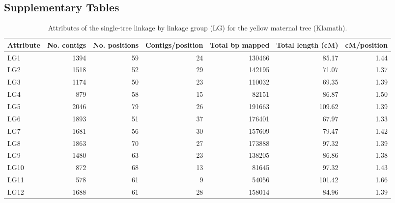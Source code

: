 \documentclass[smallextended]{svjour3}
\begin{document}
\begin{landscape}

\subsection*{Supplementary Tables}\label{ss:supp}

  
\begin{table}[ht]
  \caption{Attributes of the single-tree linkage by linkage group (LG) for the yellow maternal tree (Klamath).}
\begin{tabular}{lrrrrrr}
  \toprule
  Attribute & No. contigs & No. positions & Contigs/position & Total bp mapped & Total length (cM) & cM/position \\
  \midrule
  LG1 & 1394 & 59 & 24 & \num{130466} & 85.17 & 1.44 \\
  LG2 & 1518 & 52 & 29 & \num{142195} & 71.07 & 1.37 \\
  LG3 & 1174 & 50 & 23 & \num{110032} & 69.35 & 1.39 \\
  LG4 & 879 & 58 & 15 & \num{82151} & 86.87 & 1.50 \\
  LG5 & 2046 & 79 & 26 & \num{191663} & 109.62 & 1.39 \\
  LG6 & 1893 & 51 & 37 & \num{176401} & 67.97 & 1.33 \\
  LG7 & 1681 & 56 & 30 & \num{157609} & 79.47 & 1.42 \\
  LG8 & 1863 & 70 & 27 & \num{173888} & 97.32 & 1.39 \\
  LG9 & 1480 & 63 & 23 & \num{138205} & 86.86 & 1.38 \\
  LG10 & 872 & 68 & 13 & \num{81645} & 97.32 & 1.43 \\
  LG11 & 578 & 61 & 9 & \num{54056} & 101.42 & 1.66 \\
  LG12 & 1688 & 61 & 28 & \num{158014} & 84.96 & 1.39 \\
  \bottomrule
\end{tabular} 
\label{t:label}
\end{table}
\end{landscape}
\end{document}
